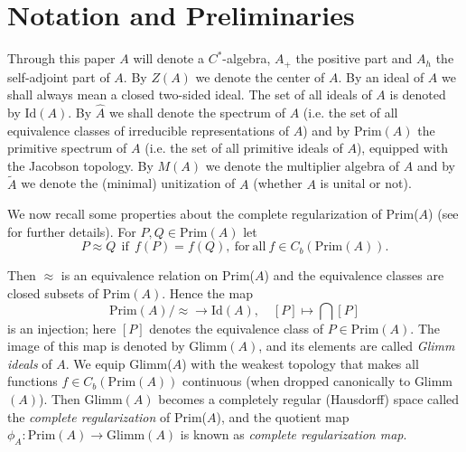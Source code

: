 \documentclass[]{amsart}
\theoremstyle{remark}
\theoremstyle{definition}
\theoremstyle{question}
\numberwithin{equation}{section}
\begin{document}
\section{Notation and Preliminaries}
 Through this paper $A$ will denote a $C^*$-algebra, $A_+$ the positive part and $A_h$ the self-adjoint part of $A$. By $Z(A)$ we denote the center of $A$. By an
ideal of $A$ we shall always mean a closed two-sided ideal. The set of all
ideals of $A$ is denoted by $\mathrm{Id}(A)$. By $\hat{A}$ we shall denote the
spectrum of $A$ (i.e. the set of all equivalence classes of irreducible
representations of $A$) and by
$\mathrm{Prim}(A)$ the primitive spectrum of $A$ (i.e. the set of all primitive
ideals of $A$), equipped with the Jacobson topology. By $M(A)$ we denote the multiplier algebra of $A$ and by $\tilde{A}$ we denote the (minimal) unitization of $A$ (whether $A$ is unital or not).
\medskip

We now recall some properties about the complete regularization of Prim($A$)
(see \cite{ArcSom1} for further details). For $P, Q \in \mathrm{Prim}(A)$ let
\begin{equation}\label{approx}
P \approx Q \ \ \mathrm{if }\ \ f(P)=f(Q), \ \mathrm{for} \ \mathrm{all} \ f \in
C_b(\mathrm{Prim}(A)).
\end{equation}

Then $\approx$ is an equivalence relation on Prim($A$) and the equivalence
classes are closed subsets of Prim$(A)$. Hence the map
$$\mathrm{Prim}(A)/\approx \to \mathrm{Id}(A), \quad [P]\mapsto \bigcap[P]$$ is
an injection; here $[P]$ denotes the equivalence class of $P \in
\mathrm{Prim}(A)$. The image of this map is denoted by Glimm$(A)$, and its
elements are called \textit{Glimm ideals} of $A$. We equip Glimm($A$) with the
weakest topology that makes all functions $f \in C_b(\mathrm{Prim}(A))$
continuous (when dropped canonically to Glimm$(A)$). Then Glimm$(A)$ becomes a
completely regular (Hausdorff) space called the \textit{complete regularization}
of Prim($A$), and the quotient map $\phi_A : \mathrm{Prim}(A) \to
\mathrm{Glimm}(A)$ is known as \textit{complete regularization map}.
\medskip
\end{document}
